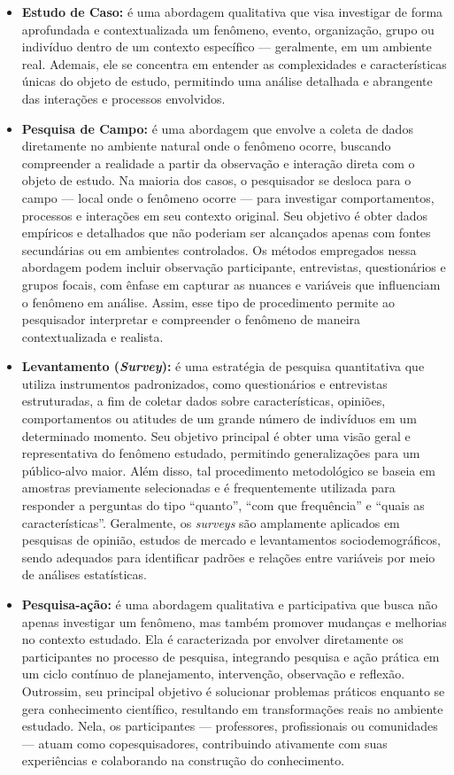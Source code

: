 \begin{itemize}[nosep, leftmargin=2.3cm]
\begin{itemize}[nosep]
            \item \textbf{Estudo de Caso:} é uma abordagem qualitativa que visa investigar de forma aprofundada e contextualizada um fenômeno, evento, organização, grupo ou indivíduo dentro de um contexto específico --- geralmente, em um ambiente real. Ademais, ele se concentra em entender as complexidades e características únicas do objeto de estudo, permitindo uma análise detalhada e abrangente das interações e processos envolvidos.
            \item \textbf{Pesquisa de Campo:} é uma abordagem que envolve a coleta de dados diretamente no ambiente natural onde o fenômeno ocorre, buscando compreender a realidade a partir da observação e interação direta com o objeto de estudo. Na maioria dos casos, o pesquisador se desloca para o campo --- local onde o fenômeno ocorre --- para investigar comportamentos, processos e interações em seu contexto original. Seu objetivo é obter dados empíricos e detalhados que não poderiam ser alcançados apenas com fontes secundárias ou em ambientes controlados. Os métodos empregados nessa abordagem podem incluir observação participante, entrevistas, questionários e grupos focais, com ênfase em capturar as nuances e variáveis que influenciam o fenômeno em análise. Assim, esse tipo de procedimento permite ao pesquisador interpretar e compreender o fenômeno de maneira contextualizada e realista.
            \item \textbf{Levantamento (\textit{Survey}):} é uma estratégia de pesquisa quantitativa que utiliza instrumentos padronizados, como questionários e entrevistas estruturadas, a fim de coletar dados sobre características, opiniões, comportamentos ou atitudes de um grande número de indivíduos em um determinado momento. Seu objetivo principal é obter uma visão geral e representativa do fenômeno estudado, permitindo generalizações para um público-alvo maior. Além disso, tal procedimento metodológico se baseia em amostras previamente selecionadas e é frequentemente utilizada para responder a perguntas do tipo ``quanto'', ``com que frequência'' e ``quais as características''. Geralmente, os \textit{surveys} são amplamente aplicados em pesquisas de opinião, estudos de mercado e levantamentos sociodemográficos, sendo adequados para identificar padrões e relações entre variáveis por meio de análises estatísticas.
            \item \textbf{Pesquisa-ação:} é uma abordagem qualitativa e participativa que busca não apenas investigar um fenômeno, mas também promover mudanças e melhorias no contexto estudado. Ela é caracterizada por envolver diretamente os participantes no processo de pesquisa, integrando pesquisa e ação prática em um ciclo contínuo de planejamento, intervenção, observação e reflexão. Outrossim, seu principal objetivo é solucionar problemas práticos enquanto se gera conhecimento científico, resultando em transformações reais no ambiente estudado. Nela, os participantes --- professores, profissionais ou comunidades --- atuam como copesquisadores, contribuindo ativamente com suas experiências e colaborando na construção do conhecimento.
        \end{itemize}
\end{itemize}
